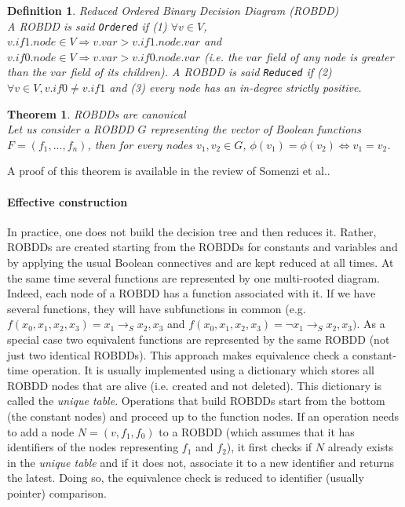\documentclass[a4paper,10pt]{article}
\newcommand{\shannon}[3]{#1 \longrightarrow_S #2, #3}
\newtheorem{newtheo}{Theorem}
\newcommand{\theorem}[2]{\begin{newtheo}{\textsf{#1}\\} #2 \end{newtheo}}
\newtheorem{newdef}{Definition}
\newcommand{\definition}[2]{\begin{newdef}{#1\\}#2\end{newdef}}
\begin{document}
\definition{Reduced Ordered Binary Decision Diagram (ROBDD)}
{
A ROBDD is said \texttt{Ordered} if (1) $\forall v\in V$, $v.\mathit{if1}.\mathit{node} \in V \Rightarrow v.\mathit{var} > v.\mathit{if1}.\mathit{node}.\mathit{var}$ and $v.\mathit{if0}.\mathit{node} \in V \Rightarrow v.\mathit{var} > v.\mathit{if0}.\mathit{node}.\mathit{var}$ (i.e. the $\mathit{var}$ field of any node is greater than the $\mathit{var}$ field of its children).
A ROBDD is said \texttt{Reduced} if (2) $\forall v\in V, v.if0 \neq v.if1$ and (3) every node has an in-degree strictly positive.
}

\theorem{ROBDDs are canonical}
{
Let us consider a ROBDD $G$ representing the vector of Boolean functions $F=(f_1, ..., f_n)$, then for every nodes $v_1, v_2 \in G$, $\phi(v_1) = \phi(v_2) \Leftrightarrow v_1 = v_2$.
}
A proof of this theorem is available in the review of Somenzi et al.\cite{Somenzi1999}.

\paragraph{Effective construction\\}
In practice, one does not build the decision tree and then reduces it.
Rather, ROBDDs are created starting from the ROBDDs for constants and variables and by applying the usual Boolean connectives and are kept reduced at all times.
At the same time several functions are represented by one multi-rooted diagram.
Indeed, each node of a ROBDD has a function associated with it.
If we have several functions, they will have subfunctions in common (e.g. $f(x_0, x_1, x_2, x_3) = \shannon{x_1}{x_2}{x_3}$ and $f(x_0, x_1, x_2, x_3) = \shannon{\lnot x_1}{x_2}{x_3})$.
As a special case two equivalent functions are represented by the same ROBDD (not just two identical ROBDDs).
This approach makes equivalence check a constant-time operation.
It is usually implemented using a dictionary which stores all ROBDD nodes that are alive (i.e. created and not deleted).
This dictionary is called the \textit{unique table}.
Operations that build ROBDDs start from the bottom (the constant nodes) and proceed up to the function nodes.
If an operation needs to add a node $N = (v, f_1, f_0)$ to a ROBDD (which assumes that it has identifiers of the nodes representing $f_1$ and $f_2$), it first checks if $N$ already exists in the \textit{unique table} and if it does not, associate it to a new identifier and returns the latest.
Doing so, the equivalence check is reduced to identifier (usually pointer) comparison.
\end{document}
